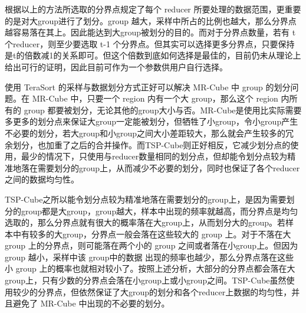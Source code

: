 根据以上的方法所选取的分界点规定了每个 reducer 所要处理的数据范围，更重要的是对大group进行了划分。group 越大，采样中所占的比例也越大，那么分界点越容易落在其上。因此能达到大group被划分的目的。而对于分界点数量，若有 t 个reducer，则至少要选取 t-1 个分界点。但其实可以选择更多分界点，只要保持是t的倍数减1的关系即可。但这个倍数到底如何选择是最佳的，目前仍未从理论上给出可行的证明，因此目前可作为一个参数供用户自行选择。




使用 TeraSort 的采样与数据划分方式正好可以解决 MR-Cube 中 group 的划分问题。在 MR-Cube 中，只要一个 region 内有一个大 group，那么这个 region 内所有的 group 都要被划分，无论其他的group大小与否。MR-Cube是使用比实际需要多更多的划分点来保证大group一定能被划分，但牺牲了小group，令小group产生不必要的划分，若大group和小group之间大小差距较大，那么就会产生较多的冗余划分，也加重了之后的合并操作。而TSP-Cube则正好相反，它减少划分点的使用，最少的情况下，只使用与reducer数量相同的划分点，但却能令划分点较为精准地落在需要划分的group上，从而减少不必要的划分，同时也保证了各个reducer之间的数据均匀性。

TSP-Cube之所以能令划分点较为精准地落在需要划分的group上，是因为需要划分的group都是大group，group越大，样本中出现的频率就越高，而分界点是均匀选取的，那么分界点就有很大的概率落在大group上，从而划分大的group。若样本中有较多的大group，分界点一般会落在这些较大的 group 上。对于不落在大 group 上的分界点，则可能落在两个小的 group 之间或者落在小group上。但因为 group 越小，采样中该 group中的数据 出现的频率也越少，那么分界点落在这些小 group 上的概率也就相对较小了。按照上述分析，大部分的分界点都会落在大group上，只有少数的分界点会落在小group上或小group之间。TSP-Cube虽然使用较少的分界点，但依然保证了大group的划分和各个reducer上数据的均匀性，并且避免了 MR-Cube 中出现的不必要的划分。

